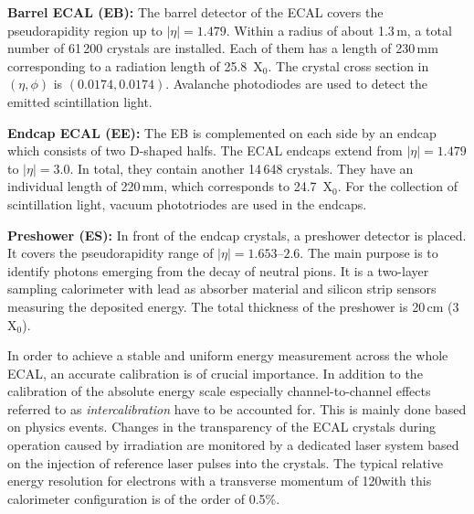 \begin{description}
 \item \textbf{Barrel ECAL (EB):} The barrel detector of the ECAL covers the pseudorapidity region up to $|\eta| = 1.479$. Within a radius of about 1.3\,m, a total number of 61\,200 crystals are installed. Each of them has a length of 230\,mm corresponding to a radiation length of 25.8~$\mathrm{X_0}$. The crystal cross section in $(\eta, \phi)$ is $(0.0174, 0.0174)$. Avalanche photodiodes are used to detect the emitted scintillation light.
 \item \textbf{Endcap ECAL (EE):} The EB is complemented on each side by an endcap which consists of two D-shaped halfs. The ECAL endcaps extend from $|\eta| = 1.479$ to $|\eta| = 3.0$. In total, they contain another 14\,648 crystals. They have an individual length of 220\,mm, which corresponds to 24.7~$\mathrm{X}_0$. For the collection of scintillation light, vacuum phototriodes are used in the endcaps.
 \item \textbf{Preshower (ES):} In front of the endcap crystals, a preshower detector is placed. It covers the pseudorapidity range of $|\eta| = 1.653$--$2.6$. The main purpose is to identify photons emerging from the decay of neutral pions. It is a two-layer sampling calorimeter with lead as absorber material and silicon strip sensors measuring the deposited energy. The total thickness of the preshower is 20\,cm (3~$\mathrm{X_0}$).
\end{description}
In order to achieve a stable and uniform energy measurement across the whole ECAL, an accurate calibration is of crucial importance. In addition to the calibration of the absolute energy scale especially channel-to-channel effects referred to as \textit{intercalibration} have to be accounted for. This is mainly done based on physics events. Changes in the transparency of the ECAL crystals during operation caused by irradiation are monitored by a dedicated laser system based on the injection of reference laser pulses into the crystals. The typical relative energy resolution for electrons with a transverse momentum of 120\gev with this calorimeter configuration is of the order of 0.5\%.

